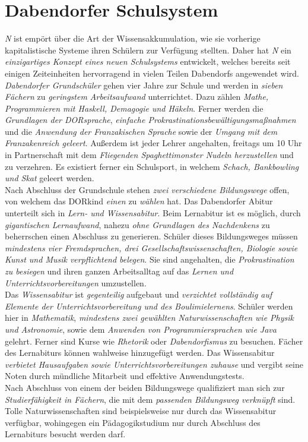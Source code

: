 \clearpage
\section{{Dabendorfer Schulsystem}}
\textit{N} ist empört über die Art der Wissensakkumulation, wie sie vorherige kapitalistische Systeme ihren Schülern zur Verfügung stellten. Daher hat \textit{N} ein \textit{einzigartiges Konzept eines neuen Schulsystems} entwickelt, welches bereits seit einigen Zeiteinheiten hervorragend in vielen Teilen Dabendorfs angewendet wird. \textit{Dabendorfer Grundschüler} gehen vier Jahre zur Schule und werden in \textit{sieben Fächern} zu \textit{geringstem Arbeitsaufwand} unterrichtet. Dazu zählen \textit{Mathe, Programmieren mit Haskell, Demagogie und Häkeln}. Ferner werden die \textit{Grundlagen der DORsprache}, \textit{einfache Prokrastinationsbewältigungsmaßnahmen} und die \textit{Anwendung der Franzakischen Sprache} sowie der \textit{Umgang mit dem Franzakenreich geleert}. Außerdem ist jeder Lehrer angehalten, freitags um 10 Uhr in Partnerschaft mit dem \textit{Fliegenden Spaghettimonster Nudeln herzustellen} und zu verzehren. Es existiert ferner ein Schulsport, in welchem \textit{Schach, Bankbowling und Skat} geleert werden.\\
Nach Abschluss der Grundschule stehen \textit{zwei verschiedene Bildungswege} offen, von welchem das DORkind \textit{einen} zu \textit{wählen} hat. Das Dabendorfer Abitur unterteilt sich in \textit{Lern- und Wissensabitur}. Beim Lernabitur ist es möglich, durch \textit{gigantischen Lernaufwand}, nahezu \textit{ohne Grundlagen des Nachdenkens} zu beherrschen einen Abschluss zu generieren. Schüler dieses Bildungsweges müssen \textit{mindestens vier Fremdsprachen, drei Gesellschaftswissenschaften, Biologie sowie Kunst und Musik verpflichtend belegen}. Sie sind angehalten, die \textit{Prokrastination zu besiegen} und ihren ganzen Arbeitsalltag auf das \textit{Lernen und Unterrichtsvorbereitungen} umzustellen.\\
Das \textit{Wissensabitur} ist \textit{gegenteilig} aufgebaut und \textit{verzichtet vollständig auf Elemente der Unterrichtsvorbereitung und des Boulimielernens}. Schüler werden hier in \textit{Mathematik}, \textit{mindestens zwei gewählten Naturwissenschaften wie Physik und Astronomie}, sowie dem \textit{Anwenden von Programmiersprachen wie Java} gelehrt. Ferner sind Kurse wie \textit{Rhetorik} oder \textit{Dabendorfismus} zu besuchen. Fächer des Lernabiturs können wahlweise hinzugefügt werden. Das Wissensabitur \textit{verbietet Hausaufgaben sowie Unterrichtsvorbereitungen zuhause} und vergibt seine Noten durch mündliche Mitarbeit und effektive Anwendungstests.\\
Nach Abschluss von einem der beiden Bildungswege qualifiziert man sich zur \textit{Studierfähigkeit in Fächern}, die mit dem \textit{passenden Bildungsweg verknüpft} sind. Tolle Naturwissenschaften sind beispielsweise nur durch das Wissensabitur verfügbar, wohingegen ein Pädagogikstudium nur durch Abschluss des Lernabiturs besucht werden darf.

